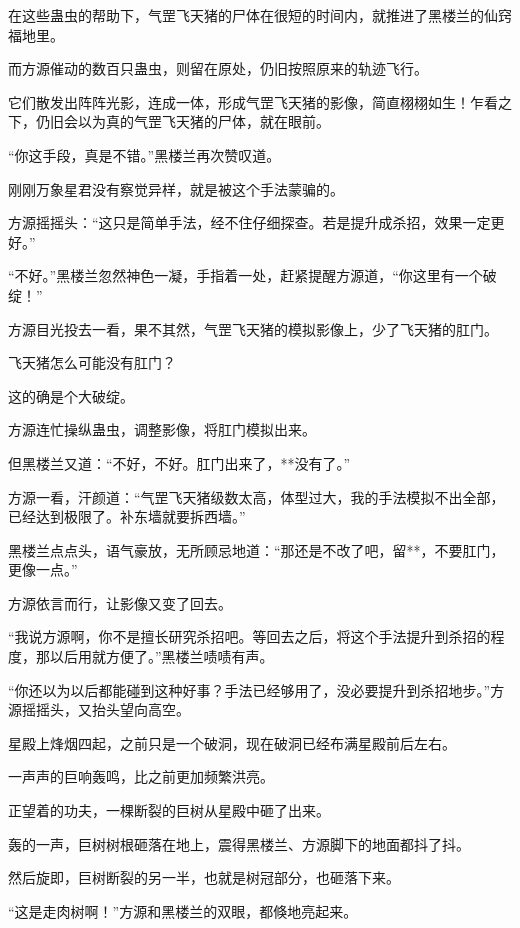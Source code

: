 \begin{this_body}
在这些蛊虫的帮助下，气罡飞天猪的尸体在很短的时间内，就推进了黑楼兰的仙窍福地里。

而方源催动的数百只蛊虫，则留在原处，仍旧按照原来的轨迹飞行。

它们散发出阵阵光影，连成一体，形成气罡飞天猪的影像，简直栩栩如生！乍看之下，仍旧会以为真的气罡飞天猪的尸体，就在眼前。

“你这手段，真是不错。”黑楼兰再次赞叹道。

刚刚万象星君没有察觉异样，就是被这个手法蒙骗的。

方源摇摇头：“这只是简单手法，经不住仔细探查。若是提升成杀招，效果一定更好。”

“不好。”黑楼兰忽然神色一凝，手指着一处，赶紧提醒方源道，“你这里有一个破绽！”

方源目光投去一看，果不其然，气罡飞天猪的模拟影像上，少了飞天猪的肛门。

飞天猪怎么可能没有肛门？

这的确是个大破绽。

方源连忙操纵蛊虫，调整影像，将肛门模拟出来。

但黑楼兰又道：“不好，不好。肛门出来了，**没有了。”

方源一看，汗颜道：“气罡飞天猪级数太高，体型过大，我的手法模拟不出全部，已经达到极限了。补东墙就要拆西墙。”

黑楼兰点点头，语气豪放，无所顾忌地道：“那还是不改了吧，留**，不要肛门，更像一点。”

方源依言而行，让影像又变了回去。

“我说方源啊，你不是擅长研究杀招吧。等回去之后，将这个手法提升到杀招的程度，那以后用就方便了。”黑楼兰啧啧有声。

“你还以为以后都能碰到这种好事？手法已经够用了，没必要提升到杀招地步。”方源摇摇头，又抬头望向高空。

星殿上烽烟四起，之前只是一个破洞，现在破洞已经布满星殿前后左右。

一声声的巨响轰鸣，比之前更加频繁洪亮。

正望着的功夫，一棵断裂的巨树从星殿中砸了出来。

轰的一声，巨树树根砸落在地上，震得黑楼兰、方源脚下的地面都抖了抖。

然后旋即，巨树断裂的另一半，也就是树冠部分，也砸落下来。

“这是走肉树啊！”方源和黑楼兰的双眼，都倏地亮起来。

\end{this_body}

